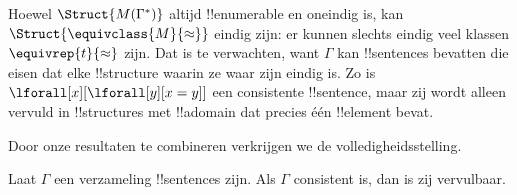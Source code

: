 \documentclass[openany]{memoir}
\begin{document}
\begin{digress}
Hoewel $\Struct{M(\Gamma^*)}$ altijd !!{enumerable} en oneindig is, kan
$\Struct{\equivclass{M}{\approx}}$ eindig zijn: er kunnen slechts eindig
veel klassen $\equivrep{t}{\approx}$ zijn. Dat is te verwachten, want
$\Gamma$ kan !!{sentence}s bevatten die eisen dat elke !!{structure}
waarin ze waar zijn eindig is. Zo is
$\lforall[x][\lforall[y][x = y]]$ een consistente !!{sentence}, maar zij
wordt alleen vervuld in !!{structure}s met !!a{domain} dat precies één
!!{element} bevat.
\end{digress}
\endgroup

\begingroup
\def\olfilename{OLP-0134}
\def\olfilepath{content/first-order-logic/completeness/}
\hypertarget{unit-OLP-0134}{}



      {}
      {}


\begin{explain}
Door onze resultaten te combineren verkrijgen we de volledigheidsstelling.
\end{explain}

\begin{thm}[Volledigheidsstelling]
Laat $\Gamma$ een verzameling !!{sentence}s zijn. Als $\Gamma$ consistent
is, dan is zij vervulbaar.
\end{thm}
\end{document}
